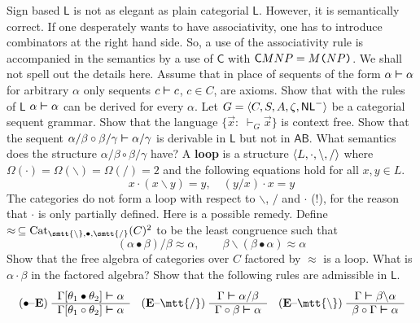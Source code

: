Sign based $\mathsf{L}$ is not as elegant as plain categorial $\mathsf{L}$. 
However, it is semantically correct. If one desperately wants to have 
associativity, one has to introduce combinators at the right hand side. 
So, a use of the associativity rule is accompanied in the semantics by 
a use of $\mathsf{C}$ with $\mathsf{C}MNP = M\mbox{\tt (} NP\mbox{\tt )}$. 
We shall not spell out the details here.
\vplatz
\exercise
Assume that in place of sequents of the form $\alpha \boldsymbol{\vdash} \alpha$ for
arbitrary $\alpha$ only sequents $c \boldsymbol{\vdash} c$, $c \in C$,
are axioms. Show that with the rules of $\mathsf{L}$
$\alpha \boldsymbol{\vdash} \alpha$ can be derived for every
$\alpha$.
\vplatz
\exercise
Let $G = \langle C, S, A, \zeta, \mathsf{NL}^-\rangle$ be a
categorial sequent grammar. Show that the language
$\{\vec{x} : \; \vdash_G \vec{x}\}$ is context free.
\vplatz \exercise%
Show that the sequent $\alpha/\beta \circ \beta/\gamma \boldsymbol{\vdash}
\alpha/\gamma$ is derivable in $\mathsf{L}$ but not in $\mathsf{AB}$.
What semantics does the structure $\alpha/\beta \circ
\beta/\gamma$ have?
\vplatz
\exercise
A \textbf{loop} is a structure $\langle L, \cdot, \backslash, /\rangle$
where $\Omega(\cdot) = \Omega(\backslash) = \Omega(/)= 2$ and
the following equations hold for all $x, y \in L$.
\begin{equation}
x \cdot (x\backslash y) = y, \quad (y/x) \cdot x = y
\end{equation}
The categories do not form a loop with respect to $\backslash$,
$/$ and $\cdot$ (!), for the reason that $\cdot$ is only
partially defined. Here is a possible remedy. Define
$\approx\,  \subseteq \Cat_{{\smtt{\tb}}, \bullet, {\smtt{\tf}}}(C)^2$ 
to be the least congruence such that
\begin{equation}
(\alpha \bullet \beta)/\beta \approx \alpha, \qquad
\beta\backslash(\beta\bullet \alpha) \approx \alpha
\end{equation}
Show that the free algebra of categories over $C$ factored by
$\approx$ is a loop. What is $\alpha \cdot \beta$ in the factored
algebra?
\vplatz 
\exercise%
Show that the following rules are admissible in $\mathsf{L}$.
\begin{equation}
\mbox{($\bullet$--\textbf{E})}\
\begin{array}{c}
\Gamma[\theta_1 \bullet \theta_2] \bvdash \alpha \\\hline
\Gamma[\theta_1 \circ \theta_2]   \bvdash \alpha
\end{array}
\quad \mbox{(\textbf{E}--{\mtt{\tf}})}\
\begin{array}{c}
\Gamma \bvdash \alpha/\beta \\\hline \Gamma \circ \beta \bvdash
\alpha
\end{array}
\quad \mbox{(\textbf{E}--{\mtt{\tb}})}\
\begin{array}{c}
\Gamma \bvdash \beta\backslash \alpha \\\hline \beta \circ \Gamma
\bvdash \alpha
\end{array}
\end{equation}
